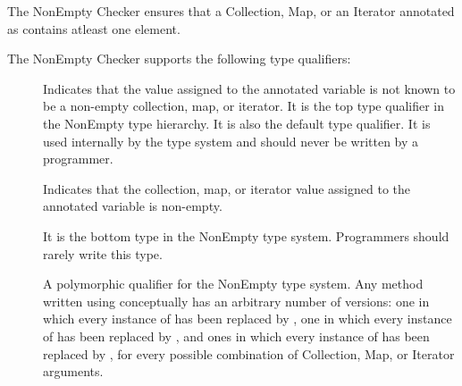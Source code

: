 \htmlhr
{}

The NonEmpty Checker ensures that a Collection, Map, or an Iterator annotated as
 contains atleast one element.

The NonEmpty Checker supports the following type qualifiers:
\begin{description}

    \item[]
    Indicates that the value assigned to the annotated variable is not known to be a non-empty
    collection, map, or iterator. It is the top type qualifier in the NonEmpty type hierarchy. It is also the default type
    qualifier.
    It is used internally by the type system and should never be written by a programmer.

    \item[]
    Indicates that the collection, map, or iterator value assigned to the annotated variable is non-empty.

    \item[]
    It is the bottom type in the NonEmpty type system. Programmers should rarely write this type.

    \item[]
    A polymorphic qualifier for the NonEmpty type system.
    Any method written using  conceptually has an arbitrary number of
    versions: one in which every instance of  has been replaced by
    , one in which every instance of 
    has been replaced by , and ones in which every instance of
     has been replaced by , for every possible
    combination of Collection, Map, or Iterator arguments.

\end{description}

